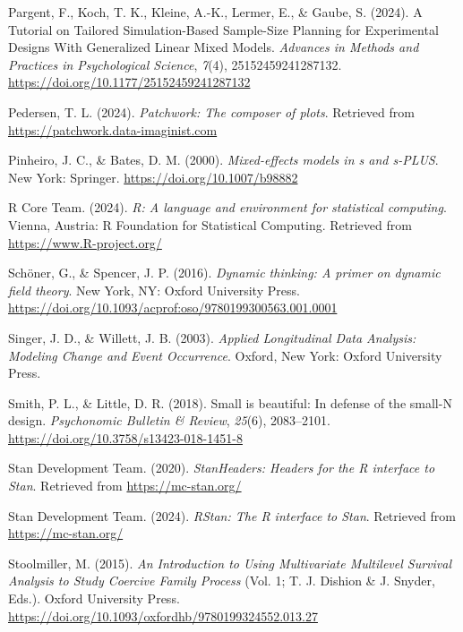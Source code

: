 \documentclass[
  man, donotrepeattitle,floatsintext]{apa6}
\newlength{\cslhangindent}
\newenvironment{CSLReferences}[2] %
 {\begin{list}{}{%
  \setlength{\itemindent}{0pt}
  \setlength{\leftmargin}{0pt}
  \setlength{\parsep}{0pt}
  \ifodd #1
   \setlength{\leftmargin}{\cslhangindent}
   \setlength{\itemindent}{-1\cslhangindent}
  \fi
  \setlength{\itemsep}{#2\baselineskip}}}
 {\end{list}}
\begin{document}
\begin{CSLReferences}{1}{0}
Pargent, F., Koch, T. K., Kleine, A.-K., Lermer, E., \& Gaube, S. (2024). A {Tutorial} on {Tailored Simulation-Based Sample-Size Planning} for {Experimental Designs With Generalized Linear Mixed Models}. \emph{Advances in Methods and Practices in Psychological Science}, \emph{7}(4), 25152459241287132. \url{https://doi.org/10.1177/25152459241287132}

Pedersen, T. L. (2024). \emph{Patchwork: The composer of plots}. Retrieved from \url{https://patchwork.data-imaginist.com}

Pinheiro, J. C., \& Bates, D. M. (2000). \emph{Mixed-effects models in s and s-PLUS}. New York: Springer. \url{https://doi.org/10.1007/b98882}

R Core Team. (2024). \emph{R: A language and environment for statistical computing}. Vienna, Austria: R Foundation for Statistical Computing. Retrieved from \url{https://www.R-project.org/}

Schöner, G., \& Spencer, J. P. (2016). \emph{Dynamic thinking: A primer on dynamic field theory}. New York, NY: Oxford University Press. \url{https://doi.org/10.1093/acprof:oso/9780199300563.001.0001}

Singer, J. D., \& Willett, J. B. (2003). \emph{Applied {Longitudinal Data Analysis}: {Modeling Change} and {Event Occurrence}}. Oxford, New York: Oxford University Press.

Smith, P. L., \& Little, D. R. (2018). Small is beautiful: {In} defense of the small-{N} design. \emph{Psychonomic Bulletin \& Review}, \emph{25}(6), 2083--2101. \url{https://doi.org/10.3758/s13423-018-1451-8}

Stan Development Team. (2020). \emph{{StanHeaders}: Headers for the {R} interface to {Stan}}. Retrieved from \url{https://mc-stan.org/}

Stan Development Team. (2024). \emph{{RStan}: The {R} interface to {Stan}}. Retrieved from \url{https://mc-stan.org/}

Stoolmiller, M. (2015). \emph{An {Introduction} to {Using Multivariate Multilevel Survival Analysis} to {Study Coercive Family Process}} (Vol. 1; T. J. Dishion \& J. Snyder, Eds.). Oxford University Press. \url{https://doi.org/10.1093/oxfordhb/9780199324552.013.27}


\end{CSLReferences}
\end{document}
